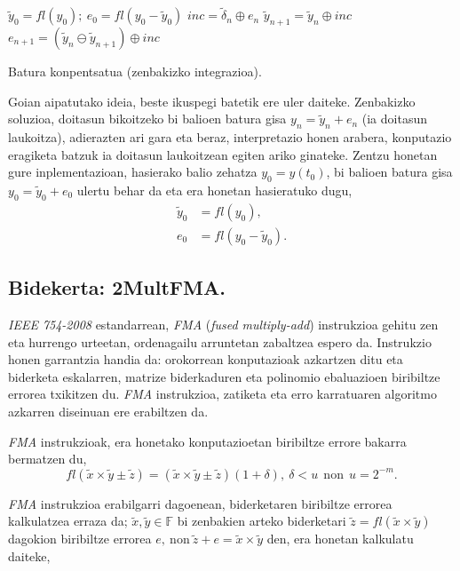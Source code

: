 \begin{algorithm}[H]
 \BlankLine
  $\tilde{y}_{0}=fl(y_{0}); \ e_0=fl(y_0-\tilde{y}_0)$\;
 \BlankLine
  {
   \BlankLine
    $inc=\tilde {\delta}_n \oplus e_n$\;
    $\tilde {y}_{n+1}=\tilde{y}_n \oplus inc$\;
    $e_{n+1}=(\tilde{y}_n \ominus \tilde {y}_{n+1}) \oplus inc$\;
   \BlankLine
  }
 \caption{Batura konpentsatua (zenbakizko integrazioa).}
 \label{alg:batkp}
\end{algorithm}


Goian aipatutako ideia,  beste ikuspegi batetik ere uler daiteke. Zenbakizko soluzioa, doitasun bikoitzeko bi balioen batura gisa $y_n=\tilde{y}_n+e_n$ (ia doitasun laukoitza), adierazten ari gara  eta beraz, interpretazio honen arabera, konputazio eragiketa batzuk ia doitasun laukoitzean egiten ariko ginateke. Zentzu honetan gure inplementazioan, hasierako balio zehatza $y_0=y(t_0)$, bi balioen batura gisa $y_0=\tilde{y}_0+e_0$ ulertu behar da eta era honetan hasieratuko dugu,
\begin{align*}
\tilde{y}_0 &=fl(y_0) ,\\
e_0 &=fl(y_0-\tilde{y}_0).
\end{align*}

\subsection*{Bidekerta: 2MultFMA.}

\emph{IEEE 754-2008} estandarrean, \emph{FMA} \cite{Muller2009} (\emph{fused multiply-add}) instrukzioa gehitu zen eta hurrengo urteetan, ordenagailu arruntetan zabaltzea espero da. Instrukzio honen garrantzia handia da: orokorrean konputazioak azkartzen ditu eta biderketa eskalarren, matrize biderkaduren eta polinomio ebaluazioen biribiltze errorea txikitzen du. \emph{FMA} instrukzioa, zatiketa eta erro karratuaren algoritmo azkarren diseinuan ere erabiltzen da.

\emph{FMA} instrukzioak, era honetako konputazioetan biribiltze errore bakarra bermatzen du,
\begin{equation*}
fl(\tilde x \times \tilde y \pm \tilde z)= (\tilde x \times \tilde y\pm \tilde z) (1+\delta), \ \delta<u \ \ \text{non} \ \ u=2^{-m}.
\end{equation*}
 

\emph{FMA}  instrukzioa erabilgarri dagoenean, biderketaren biribiltze errorea kalkulatzea erraza da; $\tilde x,\tilde y \in \mathbb{F}$ bi zenbakien arteko biderketari $\tilde z= fl(\tilde x \times \tilde y)$ dagokion biribiltze errorea $e, \ \text{non} \  \tilde{z}+ e=\tilde x \times \tilde y$ den, era honetan kalkulatu daiteke,

